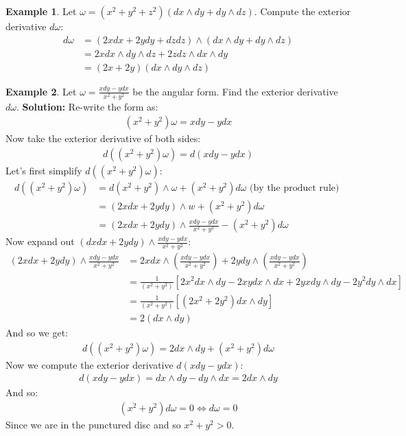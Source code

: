 \documentclass[11pt]{scrartcl}
\theoremstyle{definition}
\newtheorem{ex}{Example}
\theoremstyle{remark}
\begin{document}
{\begin{ex}
	Let $\omega = (x^2+y^2+z^2)(dx \wedge dy + dy \wedge dz)$. Compute the exterior derivative $d \omega$: 
	\begin{align*}
		d \omega & = (2x dx + 2y dy + dz dz) \wedge (dx \wedge dy + dy \wedge dz) \\
		& = 2x dx \wedge dy \wedge dz + 2z dz \wedge dx \wedge dy \\
		& = (2x + 2y) (dx \wedge dy \wedge dz) 
	\end{align*}
\end{ex}

\begin{ex}
	Let $\omega = \frac{xdy - ydx}{x^2 + y^2}$ be the angular form. Find the exterior derivative $d \omega$. 
	\newline
	\textbf{Solution:} Re-write the form as: 
	\begin{align*}
		(x^2 + y^2) \omega = xdy - ydx 
	\end{align*}
	Now take the exterior derivative of both sides: 
	\begin{align*}
		d ( (x^2 + y^2) \omega ) = d (xdy - ydx)
	\end{align*}
	Let's first simplify $d ( (x^2 + y^2) \omega )$: 
	\begin{align*}
		d ( (x^2 + y^2) \omega ) & = d(x^2 + y^2) \wedge \omega + (x^2 + y^2) d \omega \text{ (by the product rule) } \\
		& = (2x dx + 2y dy ) \wedge w + (x^2 + y^2) d \omega \\
		& = (2x dx + 2y dy ) \wedge \frac{x dy - y dx}{x^2 + y^2} - (x^2 + y^2) d \omega 
	\end{align*}
	Now expand out $(dx dx + 2y dy ) \wedge \frac{x dy - y dx}{x^2 + y^2}$: 
	\begin{align*}
		(2x dx + 2y dy ) \wedge \frac{x dy - y dx}{x^2 + y^2} & = 2x dx \wedge \left( \frac{xdy - ydx}{x^2 + y^2} \right) + 2y dy \wedge \left( \frac{x dy - y dx}{x^2 + y^2} \right) \\
		& = \frac{1}{(x^2+y^2)} \left[ 	2x^2 dx \wedge dy - 2xy dx \wedge dx + 2yx dy \wedge dy  - 2y^2 dy \wedge dx			\right ] \\
		& = \frac{1}{(x^2+y^2)} \left[ (2x^2 + 2y^2) dx \wedge dy \right] \\
		& = 2 (dx \wedge dy) 
	\end{align*} 
	And so we get: 
	\begin{align*}
		d( (x^2 + y^2) \omega ) = 2 dx \wedge dy + (x^2 + y^2) d \omega 
	\end{align*}
	Now we compute the exterior derivative $d(xdy - ydx)$: 
	\begin{align*}
		d(xdy - ydx)  = dx \wedge dy - dy \wedge dx = 2dx \wedge dy 
	\end{align*}
	And so: 
	\begin{align*}
		(x^2 + y^2) d \omega = 0 \iff d \omega = 0
	\end{align*}
	Since we are in the punctured disc and so $x^2 + y^2  > 0$. 
\end{ex}

}
\end{document}
